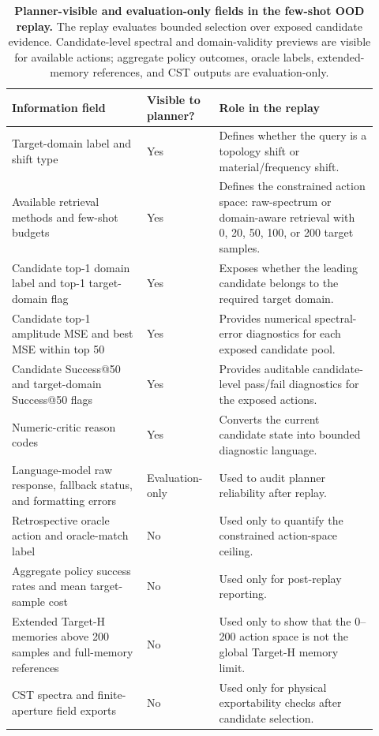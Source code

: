 \documentclass[final,1p,times]{elsarticle}
\begin{document}
\begin{table}[htbp!]
\centering
\caption{\textbf{Planner-visible and evaluation-only fields in the few-shot OOD replay.}
The replay evaluates bounded selection over exposed candidate evidence. Candidate-level spectral and domain-validity previews are visible for available actions; aggregate policy outcomes, oracle labels, extended-memory references, and CST outputs are evaluation-only.}
\label{tab:si_visibility_preview_greedy}
\small
\setlength{\tabcolsep}{4.5pt}
\renewcommand{\arraystretch}{1.12}
\begin{tabular}{p{0.34\linewidth}p{0.18\linewidth}p{0.40\linewidth}}
\toprule
Information field & Visible to planner? & Role in the replay \\
\midrule
Target-domain label and shift type & Yes & Defines whether the query is a topology shift or material/frequency shift. \\
Available retrieval methods and few-shot budgets & Yes & Defines the constrained action space: raw-spectrum or domain-aware retrieval with 0, 20, 50, 100, or 200 target samples. \\
Candidate top-1 domain label and top-1 target-domain flag & Yes & Exposes whether the leading candidate belongs to the required target domain. \\
Candidate top-1 amplitude MSE and best MSE within top 50 & Yes & Provides numerical spectral-error diagnostics for each exposed candidate pool. \\
Candidate Success@50 and target-domain Success@50 flags & Yes & Provides auditable candidate-level pass/fail diagnostics for the exposed actions. \\
Numeric-critic reason codes & Yes & Converts the current candidate state into bounded diagnostic language. \\
Language-model raw response, fallback status, and formatting errors & Evaluation-only & Used to audit planner reliability after replay. \\
Retrospective oracle action and oracle-match label & No & Used only to quantify the constrained action-space ceiling. \\
Aggregate policy success rates and mean target-sample cost & No & Used only for post-replay reporting. \\
Extended Target-H memories above 200 samples and full-memory references & No & Used only to show that the 0--200 action space is not the global Target-H memory limit. \\
CST spectra and finite-aperture field exports & No & Used only for physical exportability checks after candidate selection. \\
\bottomrule
\end{tabular}
\end{table}
\end{document}
